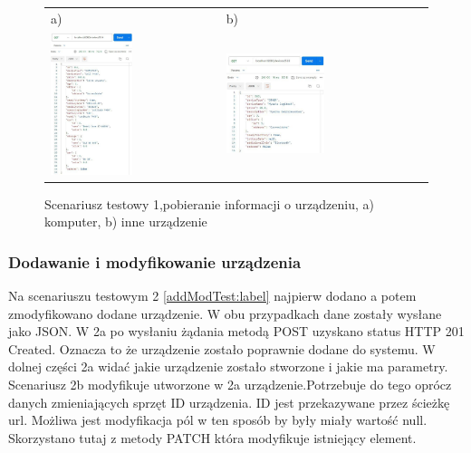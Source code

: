 \begin{figure}[htb]
  \centering
	\begin{tabular}{@{}ll@{}}
	a) & b) \\
  \includegraphics[width=0.5\textwidth]{rys06/postmanTest/compById.pdf} & 
	\includegraphics[width=0.5\textwidth]{rys06/postmanTest/otherById.pdf}
	\end{tabular}
  \caption{Scenariusz testowy 1,pobieranie informacji o urządzeniu, a) komputer, b) inne urządzenie}
  \label{getByIdTest:label}
\end{figure}



\subsubsection{Dodawanie i modyfikowanie urządzenia}
Na scenariuszu testowym 2 \ref{addModTest:label} najpierw dodano a potem zmodyfikowano dodane urządzenie. W obu przypadkach dane zostały wysłane jako JSON. W 2a po wysłaniu żądania metodą POST uzyskano status HTTP 201 Created. Oznacza to że urządzenie zostało poprawnie dodane do systemu. W dolnej części 2a widać jakie urządzenie zostało stworzone i jakie ma parametry. Scenariusz 2b modyfikuje utworzone w 2a urządzenie.Potrzebuje do tego oprócz danych zmieniających sprzęt ID urządzenia. ID jest przekazywane przez ścieżkę url. Możliwa jest modyfikacja pól w ten sposób by były miały wartość null. Skorzystano tutaj z metody PATCH która modyfikuje istniejący element.

